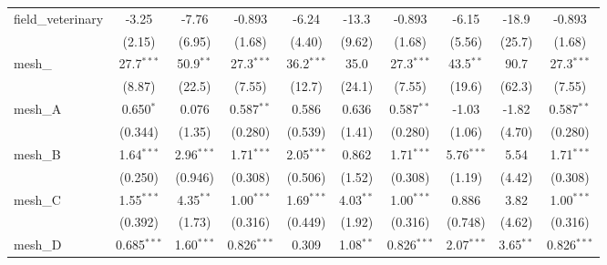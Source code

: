 \begin{tabular}{lccccccccc}
   field\_veterinary                                           & -3.25          & -7.76         & -0.893         & -6.24          & -13.3        & -0.893         & -6.15         & -18.9         & -0.893\\   
                                                               & (2.15)         & (6.95)        & (1.68)         & (4.40)         & (9.62)       & (1.68)         & (5.56)        & (25.7)        & (1.68)\\   
   mesh\_                                                      & 27.7$^{***}$   & 50.9$^{**}$   & 27.3$^{***}$   & 36.2$^{***}$   & 35.0         & 27.3$^{***}$   & 43.5$^{**}$   & 90.7          & 27.3$^{***}$\\   
                                                               & (8.87)         & (22.5)        & (7.55)         & (12.7)         & (24.1)       & (7.55)         & (19.6)        & (62.3)        & (7.55)\\   
   mesh\_A                                                     & 0.650$^{*}$    & 0.076         & 0.587$^{**}$   & 0.586          & 0.636        & 0.587$^{**}$   & -1.03         & -1.82         & 0.587$^{**}$\\   
                                                               & (0.344)        & (1.35)        & (0.280)        & (0.539)        & (1.41)       & (0.280)        & (1.06)        & (4.70)        & (0.280)\\   
   mesh\_B                                                     & 1.64$^{***}$   & 2.96$^{***}$  & 1.71$^{***}$   & 2.05$^{***}$   & 0.862        & 1.71$^{***}$   & 5.76$^{***}$  & 5.54          & 1.71$^{***}$\\   
                                                               & (0.250)        & (0.946)       & (0.308)        & (0.506)        & (1.52)       & (0.308)        & (1.19)        & (4.42)        & (0.308)\\   
   mesh\_C                                                     & 1.55$^{***}$   & 4.35$^{**}$   & 1.00$^{***}$   & 1.69$^{***}$   & 4.03$^{**}$  & 1.00$^{***}$   & 0.886         & 3.82          & 1.00$^{***}$\\   
                                                               & (0.392)        & (1.73)        & (0.316)        & (0.449)        & (1.92)       & (0.316)        & (0.748)       & (4.62)        & (0.316)\\   
   mesh\_D                                                     & 0.685$^{***}$  & 1.60$^{***}$  & 0.826$^{***}$  & 0.309          & 1.08$^{**}$  & 0.826$^{***}$  & 2.07$^{***}$  & 3.65$^{**}$   & 0.826$^{***}$\\   

\end{tabular}
